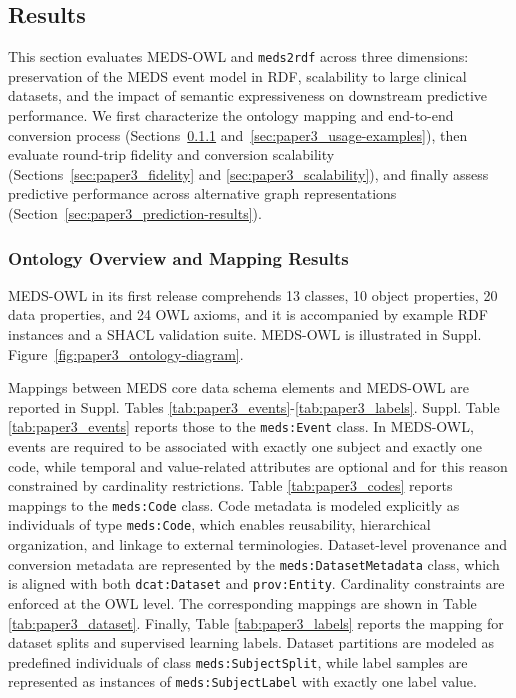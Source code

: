 \subsection{Results}\label{sec:paper3_results}
This section evaluates MEDS-OWL and \texttt{meds2rdf} across three dimensions: preservation of the MEDS event model in RDF, scalability to large clinical datasets, and the impact of semantic expressiveness on downstream predictive performance. We first characterize the ontology mapping and end-to-end conversion process (Sections~\ref{sec:paper3_ontology-mapping} and~\ref{sec:paper3_usage-examples}), then evaluate round-trip fidelity and conversion scalability (Sections~\ref{sec:paper3_fidelity} and
\ref{sec:paper3_scalability}), and finally assess predictive performance across alternative graph representations (Section~\ref{sec:paper3_prediction-results}).

\subsubsection{Ontology Overview and Mapping Results}\label{sec:paper3_ontology-mapping}
MEDS-OWL in its first release comprehends  13 classes, 10 object properties, 20 data properties, and 24 OWL axioms, and it is accompanied by example RDF instances and a SHACL validation suite. MEDS-OWL is illustrated in Suppl. Figure~\ref{fig:paper3_ontology-diagram}. %

Mappings between MEDS core data schema elements and MEDS-OWL are reported in Suppl. Tables \ref{tab:paper3_events}-\ref{tab:paper3_labels}. Suppl. Table \ref{tab:paper3_events} reports those to the \texttt{meds:Event} class. In MEDS-OWL, events are required to be associated with exactly one subject and exactly one code, while temporal and value-related attributes are optional and for this reason constrained by cardinality restrictions. Table \ref{tab:paper3_codes} reports mappings to the \texttt{meds:Code} class. Code metadata is modeled explicitly as individuals of type \texttt{meds:Code}, which enables reusability, hierarchical organization, and linkage to external terminologies. Dataset-level provenance and conversion metadata are represented by the \texttt{meds:DatasetMetadata} class, which is aligned with both \texttt{dcat:Dataset} and \texttt{prov:Entity}. Cardinality constraints are enforced at the OWL level. The corresponding mappings are shown in Table \ref{tab:paper3_dataset}. Finally, Table \ref{tab:paper3_labels} reports the mapping for dataset splits and supervised learning labels. Dataset partitions are modeled as predefined individuals of class \texttt{meds:SubjectSplit}, while label samples are represented as instances of \texttt{meds:SubjectLabel} with exactly one label value.

